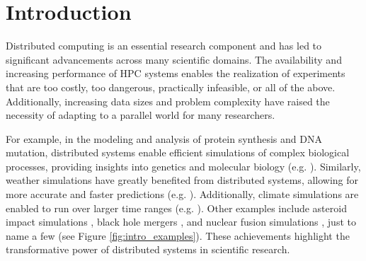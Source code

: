 \documentclass{juliacon}
\begin{document}


\maketitle


\begin{abstract}
\texttt{DistributedWorkflows.jl} is a serializer-independent interface to a distributed task-based workflow management system.
This package aims to simplify the process of writing distributed applications.
Given a workflow pattern in the form of a Petri net and the Julia code for the workflow tasks, it can be used on a cluster, for example with Slurm, to automate the application's parallel deployment. 
This makes \texttt{DistributedWorkflows.jl} an invaluable addition to Julia's growing ecosystem of high-performance computing.
\end{abstract}


\section{Introduction}
\label{sec:introduction}

Distributed computing is an essential research component and has led to significant advancements across many scientific domains.
The availability and increasing performance of HPC systems enables the realization of experiments that are too costly, too dangerous, practically infeasible, or all of the above.
Additionally, increasing data sizes and problem complexity have raised the necessity of adapting to a parallel world for many researchers.\vskip 6pt

For example, in the modeling and analysis of protein synthesis and DNA mutation, distributed systems enable efficient simulations of complex biological processes, providing insights into genetics and molecular biology (e.g. \cite{biology_example_petrinets_openaccess}).
Similarly, weather simulations have greatly benefited from distributed systems, allowing for more accurate and faster predictions (e.g. \cite{WeatherForcast_HPC_paper}).
Additionally, climate simulations are enabled to run over larger time ranges (e.g. \cite{TheJuly2019EuropeanHeatWaveinaWarmerClimateStorylineScenarioswithaCoupledModelUsingSpectralNudging}).
Other examples include asteroid impact simulations \cite{asteroid_vis_paper}, black hole mergers \cite{blackhole_merger}, and nuclear fusion simulations \cite{in_situ_visualization_large_scale_fusion_simulation}, just to name a few (see Figure \ref{fig:intro_examples}).
These achievements highlight the transformative power of distributed systems in scientific research.\vskip 6pt
\end{document}
